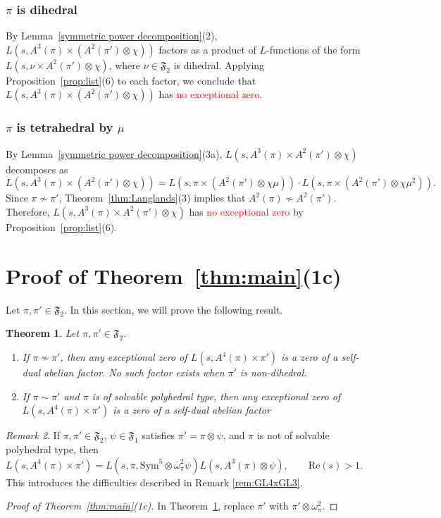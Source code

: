 \documentclass[11pt]{amsart}
\newtheorem{theorem}{Theorem}[section]
\theoremstyle{remark}
\newtheorem{remark}[theorem]{Remark}
\newcommand{\Sym}{\mathrm{Sym}}
\newcommand{\re}{\mathrm{Re}}
\renewcommand{\bar}{\overline}
\newcommand{\fF}{\mathfrak{F}}
\numberwithin{equation}{section}
\begin{document}
\subsubsection{$\pi$ is dihedral}
By Lemma~\ref{symmetric power decomposition}(2), $L(s,A^3(\pi) \times (A^2(\pi') \otimes \chi))$ factors as a product of $L$-functions of the form $L(s,\nu \times A^2(\pi') \otimes \chi)$, where $\nu \in \fF_2$ is dihedral. Applying   Proposition~\ref{prop:list}(6) to each factor, we conclude that $L(s,A^3(\pi) \times (A^2(\pi') \otimes \chi))$ has \textcolor{red}{no exceptional zero}.
\subsubsection{$\pi$ is tetrahedral by $\mu$}
By Lemma~\ref{symmetric power decomposition}(3a), $L(s,A^3(\pi) \times A^2(\pi') \otimes \chi)$ decomposes as 
$$L(s,A^3(\pi) \times (A^2(\pi') \otimes \chi)) = L(s,\pi \times (A^2(\pi') \otimes \chi\mu)) \cdot L(s,\pi \times (A^2(\pi') \otimes \chi\mu^2)).$$
Since $\pi \not\sim \pi'$, Theorem~\ref{thm:Langlands}(3) implies that $A^2(\pi) \not\sim A^2(\pi')$. Therefore, $L(s,A^3(\pi) \times A^2(\pi') \otimes \chi)$ has \textcolor{red}{no exceptional zero} by Proposition~\ref{prop:list}(6).


\section{Proof of Theorem~\ref{thm:main}(1c)}
\label{sec:1c}

Let $\pi,\pi'\in\mathfrak{F}_2$.  In this section, we will prove the following result.
\begin{theorem}
\label{thm:GL5xGL2}
Let $\pi,\pi' \in \fF_2$.  
\begin{enumerate}
	\item If $\pi\not\sim\pi'$, then any exceptional zero of $L(s,A^4(\pi)\times\pi')$ is a zero of a self-dual abelian factor.  No such factor exists when $\pi'$ is non-dihedral.
	\item If $\pi\sim\pi'$ and $\pi$ is of solvable polyhedral type, then any exceptional zero of $L(s,A^4(\pi)\times\pi')$ is a zero of a self-dual abelian factor
\end{enumerate}
\end{theorem}
\begin{remark}
\label{rem:2}
If $\pi,\pi'\in\mathfrak{F}_2$, $\psi\in\mathfrak{F}_1$ satisfies $\pi'=\pi\otimes\psi$, and $\pi$ is not of solvable polyhedral type, then
\[
L(s,A^4(\pi)\times\pi')=L(s,\pi,\Sym^5\otimes\bar{\omega}_{\pi}^2\psi)L(s,A^3(\pi)\otimes\psi),\qquad \re(s)>1.
\]
This introduces the difficulties described in Remark \ref{rem:GL4xGL3}.
\end{remark}
\begin{proof}[Proof of Theorem~\ref{thm:main}(1c)]
In Theorem~\ref{thm:GL5xGL2}, replace $\pi'$ with $\pi'\otimes\omega_{\pi}^2$.
\end{proof}
\end{document}
